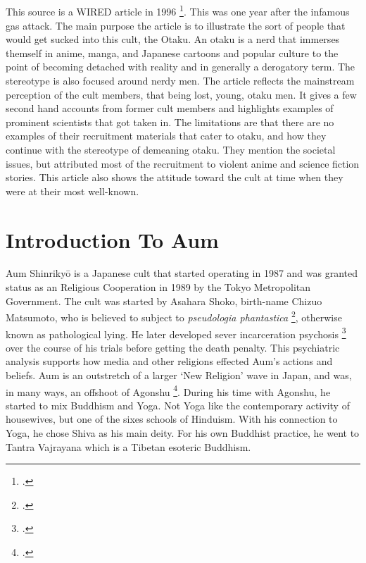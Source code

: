 \documentclass[12pt, letterpaper]{article}
\newcommand{\sorta}[1]{`#1'}
\newcommand{\poses}[1]{#1's}
\begin{document}
\subsection{}

This source is a WIRED article in 1996 \footcite{noauthor_cult_nodate}. This was one year after the infamous gas attack. The main purpose 
the article is to illustrate the sort of people that would get sucked into this cult, the Otaku. An otaku
is a nerd that immerses themself in anime, manga, and Japanese cartoons and popular culture to the point of
becoming detached with reality and in generally a derogatory term. The stereotype is also focused around 
nerdy men. The article reflects the mainstream perception of the cult members, that being lost, young, 
otaku men. It gives a few second hand accounts from former cult members and highlights examples of 
prominent scientists that got taken in. The limitations are that there are no examples of their recruitment
materials that cater to otaku, and how they continue with the stereotype of demeaning otaku. They mention
the societal issues, but attributed most of the recruitment to violent anime and science fiction stories.
This article also shows the attitude toward the cult at time when they were at their most well-known. 

\section{Introduction To Aum}
Aum Shinriky\=o is a Japanese cult that started operating in 1987 and was granted status as an Religious
Cooperation in 1989 by the Tokyo Metropolitan Government. The cult was started by Asahara Shoko, birth-name
Chizuo Matsumoto, who is believed to subject to \textit{pseudologia phantastica}
\footcite[5]{olson_aum_1999}, otherwise known as pathological lying. He later developed sever
incarceration psychosis \footcite[6]{olson_aum_1999} over the course of his trials before getting
the death penalty. This psychiatric analysis supports how media and other religions effected \poses{Aum}
actions and beliefs. Aum is an outstretch of a larger \sorta{New Religion} wave in Japan, and was, in many
ways, an offshoot of Agonshu \footcite[82,83]{watanabe_religion_1998}. During his time with Agonshu, he
started to mix Buddhism and Yoga. Not Yoga like the contemporary activity of housewives, but one of the sixes
schools of Hinduism. With his connection to Yoga, he chose Shiva as his main deity. For his own Buddhist
practice, he went to Tantra Vajrayana which is a Tibetan esoteric Buddhism.
\end{document}
